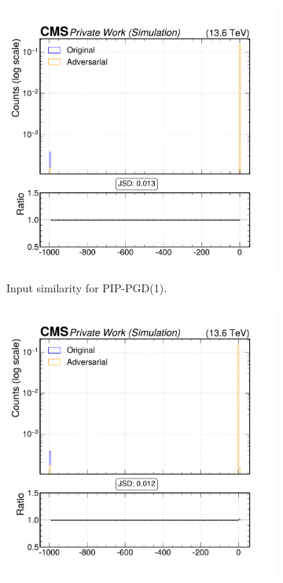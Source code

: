 \begin{figure}[h]
  \centering
  \begin{subfigure}[t]{0.32\textwidth}
    \includegraphics[width=\linewidth]{media/output/features/compare/combined_it_1/cmp_global_features_TagVarCSV_trackSumJetEtRatio.pdf}
    \caption*{Input similarity for PIP-PGD(1).}
  \end{subfigure}\hfill
  \begin{subfigure}[t]{0.32\textwidth}
    \includegraphics[width=\linewidth]{media/output/features/compare/combined_it_2/cmp_global_features_TagVarCSV_trackSumJetEtRatio.pdf}

\end{subfigure}
\end{figure}

